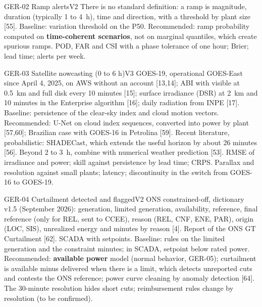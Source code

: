 \begin{ficha}{GER-02 \textperiodcentered{} Ramp alerts}{V2}
 There is no standard definition: a ramp is magnitude, duration
(typically 1 to 4~h), time and direction, with a threshold by plant size [55].
Baseline: variation threshold on the P50. Recommended: ramp
probability computed on \textbf{time-coherent scenarios}, not on marginal
quantiles, which create spurious ramps.
 POD, FAR and CSI with a phase tolerance of one hour; Brier;
lead time; alerts per week.
\end{ficha}

\begin{ficha}{GER-03 \textperiodcentered{} Satellite nowcasting (0 to 6 h)}{V3}
 GOES-19, operational GOES-East since April 4, 2025, on AWS without
an account [13,14]; ABI with visible at 0.5~km and full disk every 10 minutes [15];
surface irradiance (DSR) at 2~km and 10 minutes in the Enterprise algorithm
[16]; daily radiation from INPE [17].
 Baseline: persistence of the clear-sky index and
cloud motion vectors. Recommended: U-Net on cloud index
sequences, converted into power by plant [57,60]; Brazilian case with
GOES-16 in Petrolina [59]. Recent literature, probabilistic: SHADECast, which
extends the useful horizon by about 26 minutes [56]. Beyond 2 to 3~h,
combine with numerical weather prediction [53].
 RMSE of irradiance and power; skill against persistence
by lead time; CRPS.
 Parallax and resolution against small plants; latency;
discontinuity in the switch from GOES-16 to GOES-19.
\end{ficha}

\begin{ficha}{GER-04 \textperiodcentered{} Curtailment detected and flagged}{V2}
 ONS constrained-off, dictionary v1.5 (September 2026): generation,
limited generation, availability, reference, final reference (only for
REL, sent to CCEE), reason (REL, CNF, ENE, PAR), origin (LOC, SIS), unrealized
energy and minutes by reason [4]. Report of the ONS GT Curtailment
[62]. SCADA with setpoints.
 Baseline: rules on the limited generation and the
constraint minutes; in SCADA, setpoint below rated power. Recommended:
\textbf{available power} model (normal behavior, GER-05);
curtailment is available minus delivered when there is a limit, which detects
unreported cuts and contests the ONS reference; power curve
cleaning by anomaly detection [64].
 The 30-minute resolution hides short cuts; reimbursement
rules change by resolution (to be confirmed).
\end{ficha}

